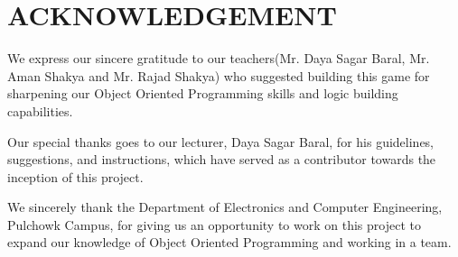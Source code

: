 \newpage
{}
\section{ACKNOWLEDGEMENT}


We express our sincere gratitude to our teachers(Mr. Daya Sagar Baral, Mr. Aman Shakya and Mr. Rajad Shakya) who suggested building this game for sharpening our Object Oriented Programming skills and logic building capabilities.

\vspace{5mm}
Our special thanks goes to our lecturer, Daya Sagar Baral, for his guidelines, suggestions, and instructions, which have served as a contributor towards the inception of this project.

\vspace{5mm}
We sincerely thank the Department of Electronics and Computer Engineering, Pulchowk Campus, for giving us an opportunity to work on this project to expand our knowledge of Object Oriented Programming and working in a team.
